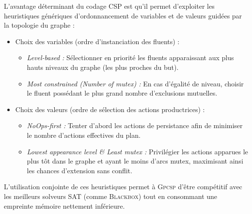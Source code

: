L'avantage déterminant du codage CSP est qu'il permet d'exploiter les heuristiques génériques d'ordonnancement de variables et de valeurs guidées par la topologie du graphe :
\begin{itemize}
    \item {Choix des variables (ordre d'instanciation des fluents) :}
    \begin{itemize}
        \item \emph{Level-based :} Sélectionner en priorité les fluents apparaissant aux plus hauts niveaux du graphe (les plus proches du but).
        \item \emph{Most constrained (Number of mutex) :} En cas d'égalité de niveau, choisir le fluent possédant le plus grand nombre d'exclusions mutuelles.
    \end{itemize}
    \item {Choix des valeurs (ordre de sélection des actions productrices) :}
    \begin{itemize}
        \item \emph{NoOps-first :} Tenter d'abord les actions de persistance afin de minimiser le nombre d'actions effectives du plan.
        \item \emph{Lowest appearance level \& Least mutex :} Privilégier les actions apparues le plus tôt dans le graphe et ayant le moins d'arcs mutex, maximisant ainsi les chances d'extension sans conflit.
    \end{itemize}
\end{itemize}

L'utilisation conjointe de ces heuristiques permet à \textsc{Gpcsp} d'être compétitif avec les meilleurs solveurs SAT (comme \textsc{Blackbox}) tout en consommant une empreinte mémoire nettement inférieure.


